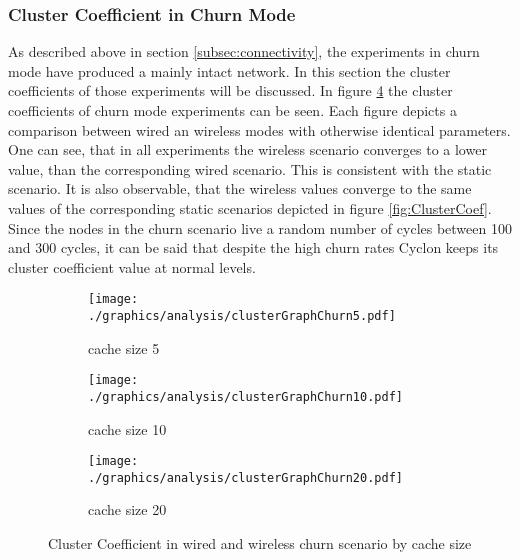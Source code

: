 \subsubsection{Cluster Coefficient in Churn Mode}
As described above in section \ref{subsec:connectivity}, the experiments in
churn mode have produced a mainly intact network. In this section the cluster
coefficients of those experiments will be discussed. In figure
\ref{fig:ClusterCoefChurn} the cluster coefficients of churn mode experiments
can be seen. Each figure depicts a comparison between wired an wireless modes
with otherwise identical parameters. One can see, that in all experiments the
wireless scenario converges to a lower value, than the corresponding wired
scenario. This is consistent with the static scenario. It is also observable, 
that the wireless values converge to the same values of the corresponding static
scenarios depicted in figure \ref{fig:ClusterCoef}. Since the nodes in the churn
scenario live a random number of cycles between 100 and 300 cycles, it can be
said that despite the high churn rates Cyclon keeps its cluster coefficient
value at normal levels. 
\begin{figure}
\begin{subfigure}{\textwidth}
	\centering
	\texttt{[image: ./graphics/analysis/clusterGraphChurn5.pdf]}
	\caption{cache size 5}
	\label{fig:ClusterCoefChurn5small}
\end{subfigure}
\begin{subfigure}{\textwidth}
	\centering
	\texttt{[image: ./graphics/analysis/clusterGraphChurn10.pdf]}
	\caption{cache size 10}
	\label{fig:ClusterCoefChurn10small}
\end{subfigure}
\begin{subfigure}{\textwidth}
	\centering
	\texttt{[image: ./graphics/analysis/clusterGraphChurn20.pdf]}
	\caption{cache size 20}
	\label{fig:ClusterCoefChurn20small}
\end{subfigure}
\caption{Cluster Coefficient in wired and wireless churn scenario by cache size}
\label{fig:ClusterCoefChurn}
\end{figure}


\begin{figure}
\begin{subfigure}{.5\textwidth}

\end{subfigure}
\end{figure}
\FloatBarrier
